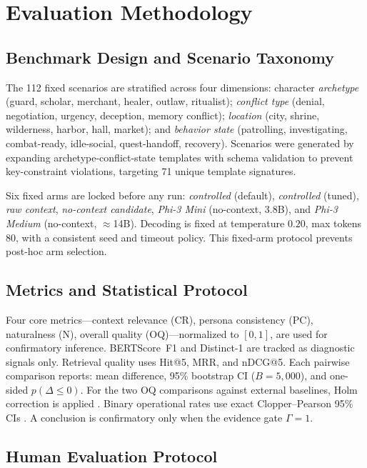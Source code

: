 \documentclass[conference]{IEEEtran}
\begin{document}
\section{Evaluation Methodology}

\subsection{Benchmark Design and Scenario Taxonomy}

The 112 fixed scenarios are stratified across four dimensions:
character \textit{archetype} (guard, scholar, merchant, healer,
outlaw, ritualist); \textit{conflict type} (denial, negotiation,
urgency, deception, memory conflict); \textit{location} (city,
shrine, wilderness, harbor, hall, market); and \textit{behavior
state} (patrolling, investigating, combat-ready, idle-social,
quest-handoff, recovery). Scenarios were generated by expanding
archetype-conflict-state templates with schema validation to
prevent key-constraint violations, targeting 71 unique
template signatures.

Six fixed arms are locked before any run: \textit{controlled}
(default), \textit{controlled} (tuned), \textit{raw context},
\textit{no-context candidate}, \textit{Phi-3 Mini} (no-context,
3.8B), and \textit{Phi-3 Medium} (no-context, $\approx$14B).
Decoding is fixed at temperature $0.20$, max tokens $80$,
with a consistent seed and timeout policy. This fixed-arm
protocol prevents post-hoc arm selection.

\subsection{Metrics and Statistical Protocol}

Four core metrics---context relevance (CR), persona consistency
(PC), naturalness (N), overall quality (OQ)---normalized to
$[0,1]$, are used for confirmatory inference. BERTScore~F1
\cite{Zhang2020BERTScore} and Distinct-1 are tracked as
diagnostic signals only. Retrieval quality uses Hit@5, MRR,
and nDCG@5. Each pairwise comparison reports: mean difference,
95\% bootstrap CI ($B=5{,}000$), and one-sided
$p(\Delta\le0)$. For the two OQ comparisons against external
baselines, Holm correction is applied \cite{Holm1979}. Binary
operational rates use exact Clopper--Pearson 95\% CIs
\cite{Clopper1934Binomial}. A conclusion is confirmatory only
when the evidence gate $\Gamma=1$.

\subsection{Human Evaluation Protocol}
\end{document}
